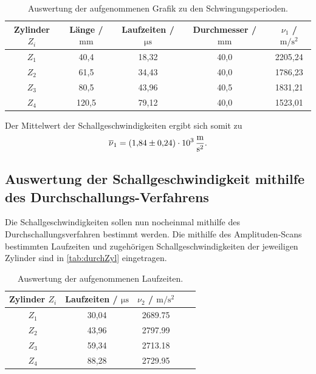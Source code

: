 \begin{table}
  \centering
  \caption{Auswertung der aufgenommenen Grafik zu den Schwingungsperioden.}
  \label{tab:tiefeZyls}
  \begin{tabular}{c c c c c}
    \toprule
    Zylinder $Z_i$ & Länge / $\si{\milli\meter}$  &  Laufzeiten / $\si{\micro\second}$ & Durchmesser / $\si{\milli\meter}$ & $\nu_1$ / $\si{\meter\per\second\squared} $\\
    \midrule
    $Z_1$ & 40,4  & 18,32 & 40,0 & 2205,24\\
    $Z_2$ & 61,5  & 34,43 & 40,0 & 1786,23 \\
    $Z_3$ & 80,5  & 43,96 & 40,5 & 1831,21 \\
    $Z_4$ & 120,5 & 79,12 & 40,0 & 1523,01 \\
    \bottomrule
  \end{tabular}
\end{table}

Der Mittelwert der Schallgeschwindigkeiten ergibt sich somit zu
\begin{align*}
  \overline \nu_1 = \SI{1.84 \pm 0,24 e3}{\meter\per\second\squared}.
\end{align*}

\subsection{Auswertung der Schallgeschwindigkeit mithilfe des Durchschallungs-Verfahrens}
\label{subsec:schallDurch}

Die Schallgeschwindigkeiten sollen nun nocheinmal mithilfe des Durchschallungsverfahren bestimmt werden.
Die mithilfe des Amplituden-Scans bestimmten Laufzeiten und zugehörigen Schallgeschwindigkeiten der jeweiligen Zylinder sind in \autoref{tab:durchZyl} eingetragen.

\begin{table}
  \centering
  \caption{Auswertung der aufgenommenen Laufzeiten.}
  \label{tab:durchZyl}
  \begin{tabular}{c c c c c}
    \toprule
    Zylinder $Z_i$ &  Laufzeiten / $\si{\micro\second}$ & $\nu_2$ / $\si{\meter\per\second\squared} $\\
    \midrule
    $Z_1$ & 30,04 & 2689.75 \\
    $Z_2$ & 43,96 & 2797.99 \\
    $Z_3$ & 59,34 & 2713.18 \\
    $Z_4$ & 88,28 & 2729.95 \\
    \bottomrule
  \end{tabular}
\end{table}

